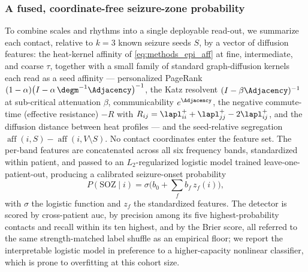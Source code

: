 \subsubsection{A fused, coordinate-free seizure-zone probability}
\label{sssec:methods_epi_detector}
To combine scales and rhythms into a single deployable read-out, we summarize each contact, relative to \(k=\num{3}\) known seizure seeds \(S\), by a vector of diffusion features: the heat-kernel affinity of \eqref{eq:methods_epi_aff} at fine, intermediate, and coarse \(\tau\), together with a small family of standard graph-diffusion kernels each read as a seed affinity --- personalized PageRank \((1-\alpha)\big(I-\alpha\,\degm^{-1}\Adjacency\big)^{-1}\), the Katz resolvent \((I-\beta\Adjacency)^{-1}\) at sub-critical attenuation \(\beta\), communicability \(e^{\Adjacency}\), the negative commute-time (effective resistance) \(-R\) with \(R_{ij}=\lapl^{+}_{ii}+\lapl^{+}_{jj}-2\lapl^{+}_{ij}\), and the diffusion distance between heat profiles --- and the seed-relative segregation \(\operatorname{aff}(i,S)-\operatorname{aff}(i,V\setminus S)\). No contact coordinates enter the feature set. The per-band features are concatenated across all six frequency bands, standardized within patient, and passed to an \(L_{2}\)-regularized logistic model trained leave-one-patient-out, producing a calibrated seizure-onset probability
\begin{equation}
    P(\mathrm{SOZ}\mid i) = \sigma\!\Big(b_{0} + \textstyle\sum_{f} b_{f}\,z_{f}(i)\Big),
    \label{eq:methods_epi_detector}
\end{equation}
with \(\sigma\) the logistic function and \(z_{f}\) the standardized features. The detector is scored by cross-patient \gls{auc}, by precision among its five highest-probability contacts and recall within its ten highest, and by the Brier score, all referred to the same strength-matched label shuffle as an empirical floor; we report the interpretable logistic model in preference to a higher-capacity nonlinear classifier, which is prone to overfitting at this cohort size.

